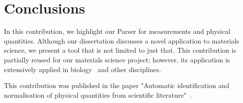 \section{Conclusions}

In this contribution, we highlight our Parser for measurements and physical quantities. Although our dissertation discusses a novel application to materials science, we present a tool that is not limited to just that. 
This contribution is partially reused for our materials science project; however, its application is extensively applied in biology~\cite{hundman2017measurement}
and other disciplines. 

This contribution was published in the paper "Automatic identification and normalisation of physical quantities from scientific literature"~\cite{foppiano2019quantities}.
